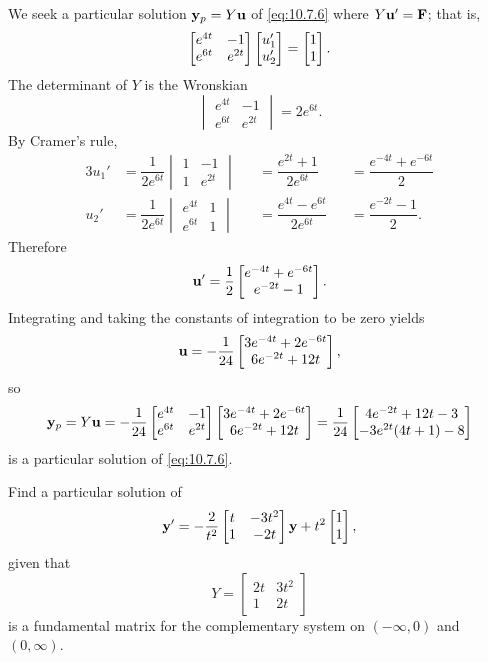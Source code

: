 \begin{solution}
We seek a particular solution
$\mathbf{y}_p=Y\mathbf{u}$ of \eqref{eq:10.7.6} where
 $Y\mathbf{u}'=\mathbf{F}$; that is,
\[
\begin{bmatrix}e^{4t}&-1\\e^{6t}&e^{2t}\end{bmatrix}
\begin{bmatrix}u_1'\\u_2'\end{bmatrix}=\begin{bmatrix}1\\1\end{bmatrix}.
\]
The determinant of $Y$ is the Wronskian
\[
\begin{vmatrix}e^{4t}&-1\\e^{6t}&e^{2t}\end{vmatrix}=2e^{6t}.
\]
By Cramer's rule,
\begin{alignat*}{3}
u_1'&=\dfrac{1}{2e^{6t}}
\begin{vmatrix}1&-1\\1&e^{2t}\end{vmatrix}
&&=\dfrac{e^{2t}+1}{2e^{6t}}
&&=\dfrac{e^{-4t}+e^{-6t}}{2}\\
u_2'&=\dfrac{1}{2e^{6t}}
\begin{vmatrix}e^{4t}&1\\e^{6t}&1\end{vmatrix}
&&=\dfrac{e^{4t}-e^{6t}}{2e^{6t}}
&&=\dfrac{e^{-2t}-1}{2}.
\end{alignat*}
Therefore
\[
\mathbf{u}'=\frac{1}{2}\begin{bmatrix}e^{-4t}+e^{-6t}\\e^{-2t}-1\end{bmatrix}.
\]
Integrating  and taking the constants of integration to be zero yields
\[
\mathbf{u}=-\frac{1}{24}\begin{bmatrix}3e^{-4t}+2e^{-6t}\\6e^{-2t}+12t\end{bmatrix},
\]
so
\[
\mathbf{y}_p=Y\mathbf{u}=
-\frac{1}{24}\begin{bmatrix}e^{4t}&-1\\e^{6t}&e^{2t}\end{bmatrix}
\begin{bmatrix}3e^{-4t}+2e^{-6t}\\6e^{-2t}+12t\end{bmatrix}
=\frac{1}{24}\begin{bmatrix}4e^{-2t}+12t-3\\-3e^{2t}(4t+1)-8\end{bmatrix}
\]
is a particular solution of  \eqref{eq:10.7.6}.
\end{solution}

\begin{example}\label{example:10.7.3}
Find a particular solution of
\begin{equation} \label{eq:10.7.7}
\mathbf{y}'=-\frac{2}{t^2
}\begin{bmatrix}t&-3t^2\\1&-2t\end{bmatrix}\mathbf{y}
+t^2\begin{bmatrix}1\\1\end{bmatrix},
\end{equation}
given that
\[
Y=\begin{bmatrix}2t&3t^2\\1&2t\end{bmatrix}
\]
is a fundamental matrix for the complementary system on $(-\infty,0)$
and $(0,\infty)$.
\end{example}

